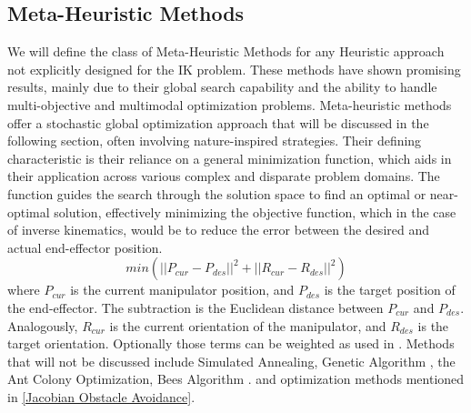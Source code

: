 \documentclass[conference]{IEEEtran}
\begin{document}
\subsection{Meta-Heuristic Methods}
We will define the class of Meta-Heuristic Methods for any Heuristic approach not explicitly designed for the IK problem. These methods have shown promising results, mainly due to their global search capability and the ability to handle multi-objective and multimodal optimization problems. Meta-heuristic methods offer a stochastic global optimization approach that will be discussed in the following section, often involving nature-inspired strategies. Their defining characteristic is their reliance on a general minimization function, which aids in their application across various complex and disparate problem domains. The function guides the search through the solution space to find an optimal or near-optimal solution, effectively minimizing the objective function, which in the case of inverse kinematics, would be to reduce the error between the desired and actual end-effector position. 
\begin{equation}
min\left( ||P_{cur} - P_{des}||^2 + ||R_{cur}-R_{des}||^2\right)
\end{equation}
where $P_{cur}$ is the current manipulator position, and $P_{des}$ is the target position of the end-effector. The subtraction is the Euclidean distance between $P_{cur}$ and $P_{des}$. Analogously, $R_{cur}$ is the current orientation of the manipulator, and $R_{des}$ is the target orientation. Optionally those terms can be weighted as used in \cite{tabandeh_adaptive_2010}.
Methods that will not be discussed include Simulated Annealing\cite{koker_neuro-simulated_2013}, Genetic Algorithm \cite{nearchou_solving_1998}, the Ant Colony Optimization\cite{chen_optimizing_2021}\cite{xu_trajectory_2023}, Bees Algorithm \cite{pham_learning_2008}\cite{dereli_simulation_2020}\cite{zhang_novel_2019}. and optimization methods mentioned in \ref{Jacobian Obstacle Avoidance}.
\end{document}
